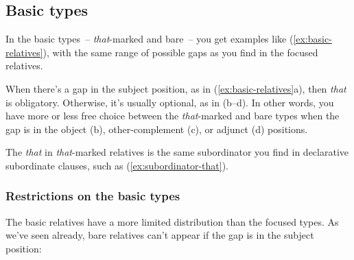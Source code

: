 \subsection{Basic types}

In the basic types~-- \textit{that}-marked and bare~-- you get examples like (\ref{ex:basic-relatives}), with the same range of possible gaps as you find in the focused relatives.

\begin{samepage}
\ea \label{ex:basic-relatives}
    \z
\z
\end{samepage}

When there's a gap in the subject position, as in (\ref{ex:basic-relatives}a), then \textit{that} is obligatory. Otherwise, it's usually optional, as in (b--d). In other words, you have more or less free choice between the \textit{that}-marked and bare types when the gap is in the object (b), other-complement (c), or adjunct (d) positions.

The \textit{that} in \textit{that}-marked relatives is the same subordinator you find in declarative subordinate clauses, such as (\ref{ex:subordinator-that}).

\ea \label{ex:subordinator-that}
    \z
\z

\subsubsection*{Restrictions on the basic types}

The basic relatives have a more limited distribution than the focused types. As we've seen already, bare relatives can't appear if the gap is in the subject position:

\ea
    \z
\z

